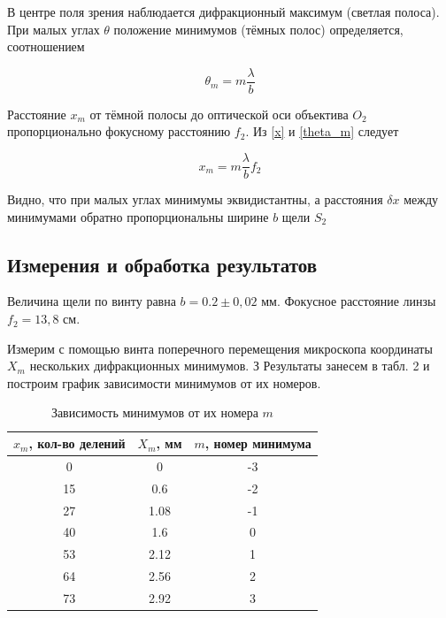 \documentclass[15pt,a5paper,reqno]{article}
\begin{document}
В центре поля зрения наблюдается дифракционный максимум (светлая полоса). При малых углах $ \theta $ положение минимумов (тёмных полос)
определяется, соотношением

\begin{equation}\label{theta_m}
\theta_m = m \dfrac{\lambda}{b}
\end{equation}

Расстояние $ x_m $ от тёмной полосы до оптической оси объектива $ O_2 $ пропорционально фокусному расстоянию $ f_2 $. Из \eqref{x} и \eqref{theta_m} следует 

\begin{equation}\label{xm}
x_m = m \dfrac{\lambda}{b} f_2
\end{equation}

Видно, что при малых углах минимумы эквидистантны, а
расстояния $ \delta x $ между минимумами обратно пропорциональны ширине $ b $ щели $ S_2 $


\subsection{Измерения и обработка результатов}

Величина щели по винту равна $ b = 0.2 \pm 0,02 $ мм. Фокусное расстояние линзы $ f_2 = 13,8 $ см.

Измерим с помощью винта поперечного перемещения микроскопа координаты $ X_m $ нескольких дифракционных минимумов. З
Результаты занесем в табл. 2 и построим график зависимости минимумов от их номеров. 

\begin{table}[h!]
	\caption{Зависимость минимумов от их номера $ m $}
	\begin{center}
		\begin{tabular}{|c|c|c|}
			\hline
			$ x_m $, кол-во делений & $ X_m $, мм & $ m $, номер минимума \\
			\hline
			0 & 0   &    -3 \\
			\hline
			15 & 0.6 &   -2 \\
            \hline
			27 & 1.08 &  -1\\
			\hline
			40 & 1.6 &    0 \\
			\hline
			53 & 2.12 &    1 \\
			\hline
			64 & 2.56 &   2\\
			\hline
			73 & 2.92 &   3 \\
			\hline
		\end{tabular}
	\end{center}
	\label{}
\end{table}
\end{document}
